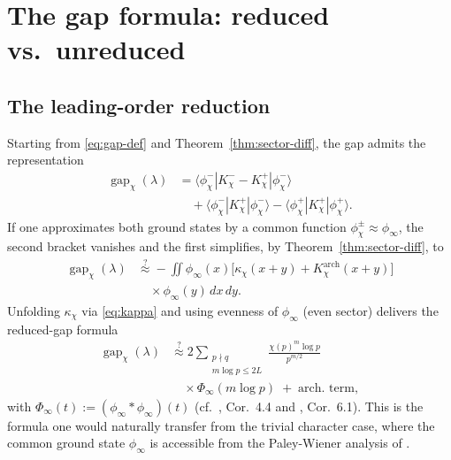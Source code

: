 \documentclass[a4paper,10pt,twocolumn]{article}
\theoremstyle{definition}
\theoremstyle{remark}
\newcommand{\gap}{\operatorname{gap}}
\newcommand{\chifn}{\chi}
\begin{document}
\section{The gap formula: reduced vs.\ unreduced}
\label{sec:formula}

\subsection{The leading-order reduction}
\label{sec:formula-reduced}

Starting from \eqref{eq:gap-def} and
Theorem~\ref{thm:sector-diff}, the gap admits the representation
\begin{equation}
\label{eq:gap-matrix}
\begin{aligned}
  \gap_{\chifn}(\lambda)
    &= \langle\phi_{\chifn}^-|K_{\chifn}^--K_{\chifn}^+|\phi_{\chifn}^-\rangle\\
    &\quad + \langle\phi_{\chifn}^-|K_{\chifn}^+|\phi_{\chifn}^-\rangle
      - \langle\phi_{\chifn}^+|K_{\chifn}^+|\phi_{\chifn}^+\rangle.
\end{aligned}
\end{equation}
If one approximates both ground states by a common function
$\phi_{\chifn}^\pm\approx\phi_\infty$, the second bracket vanishes
and the first simplifies, by Theorem~\ref{thm:sector-diff}, to
\begin{equation}
\label{eq:gap-reduced}
\begin{aligned}
  \gap_{\chifn}(\lambda)
    &\overset{?}{\approx}
      -\iint \phi_\infty(x)\bigl[\kappa_{\chifn}(x+y)
      +K^{\mathrm{arch}}_{\chifn}(x+y)\bigr]\\
    &\quad\times\phi_\infty(y)\,dx\,dy.
\end{aligned}
\end{equation}
Unfolding $\kappa_{\chifn}$ via \eqref{eq:kappa} and using evenness
of $\phi_\infty$ (even sector) delivers the reduced-gap formula
\begin{equation}
\label{eq:gap-reduced-explicit}
\begin{aligned}
  \gap_{\chifn}(\lambda)
    &\overset{?}{\approx}
      2\sum_{\substack{p\nmid q\\m\log p\leq 2L}}
        \frac{\chifn(p)^m\log p}{p^{m/2}}\\
    &\quad\times\Phi_\infty(m\log p)
      \;+\;\text{arch.\ term},
\end{aligned}
\end{equation}
with $\Phi_\infty(t):=(\phi_\infty\ast\phi_\infty)(t)$
(cf.\ \cite{AnalyticKernel}, Cor.~4.4 and \cite{AnalyticGroundstate},
Cor.~6.1). This is the formula one would naturally transfer from the
trivial character case, where the common ground state $\phi_\infty$
is accessible from the Paley-Wiener analysis of \cite{RH_II}.
\end{document}
